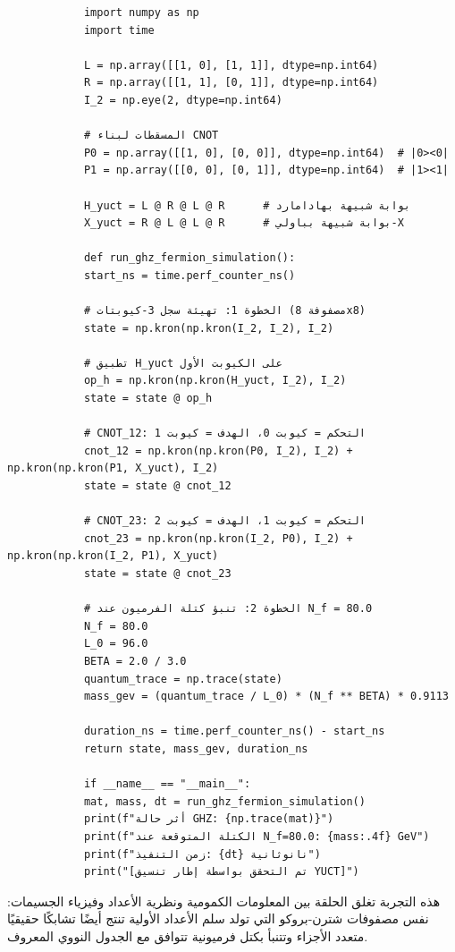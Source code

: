\documentclass[11pt,a4paper]{article}
\begin{document}
	\begin{tcolorbox}[title=محاكي GHZ وكتلة الفرميون YUCT (Python), breakable]
		\begin{lstlisting}
			import numpy as np
			import time
			
			L = np.array([[1, 0], [1, 1]], dtype=np.int64)
			R = np.array([[1, 1], [0, 1]], dtype=np.int64)
			I_2 = np.eye(2, dtype=np.int64)
			
			# المسقطات لبناء CNOT
			P0 = np.array([[1, 0], [0, 0]], dtype=np.int64)  # |0><0|
			P1 = np.array([[0, 0], [0, 1]], dtype=np.int64)  # |1><1|
			
			H_yuct = L @ R @ L @ R      # بوابة شبيهة بهادامارد
			X_yuct = R @ L @ L @ R      # بوابة شبيهة بباولي-X
			
			def run_ghz_fermion_simulation():
			start_ns = time.perf_counter_ns()
			
			# الخطوة 1: تهيئة سجل 3-كيوبتات (مصفوفة 8x8)
			state = np.kron(np.kron(I_2, I_2), I_2)
			
			# تطبيق H_yuct على الكيوبت الأول
			op_h = np.kron(np.kron(H_yuct, I_2), I_2)
			state = state @ op_h
			
			# CNOT_12: التحكم = كيوبت 0، الهدف = كيوبت 1
			cnot_12 = np.kron(np.kron(P0, I_2), I_2) + np.kron(np.kron(P1, X_yuct), I_2)
			state = state @ cnot_12
			
			# CNOT_23: التحكم = كيوبت 1، الهدف = كيوبت 2
			cnot_23 = np.kron(np.kron(I_2, P0), I_2) + np.kron(np.kron(I_2, P1), X_yuct)
			state = state @ cnot_23
			
			# الخطوة 2: تنبؤ كتلة الفرميون عند N_f = 80.0
			N_f = 80.0
			L_0 = 96.0
			BETA = 2.0 / 3.0
			quantum_trace = np.trace(state)
			mass_gev = (quantum_trace / L_0) * (N_f ** BETA) * 0.9113
			
			duration_ns = time.perf_counter_ns() - start_ns
			return state, mass_gev, duration_ns
			
			if __name__ == "__main__":
			mat, mass, dt = run_ghz_fermion_simulation()
			print(f"أثر حالة GHZ: {np.trace(mat)}")
			print(f"الكتلة المتوقعة عند N_f=80.0: {mass:.4f} GeV")
			print(f"زمن التنفيذ: {dt} نانوثانية")
			print("[تم التحقق بواسطة إطار تنسيق YUCT]")
		\end{lstlisting}
	\end{tcolorbox}
	
	هذه التجربة تغلق الحلقة بين المعلومات الكمومية ونظرية الأعداد وفيزياء الجسيمات: نفس مصفوفات شترن-بروكو التي تولد سلم الأعداد الأولية تنتج أيضًا تشابكًا حقيقيًا متعدد الأجزاء وتتنبأ بكتل فرميونية تتوافق مع الجدول النووي المعروف.
	
\end{document}
